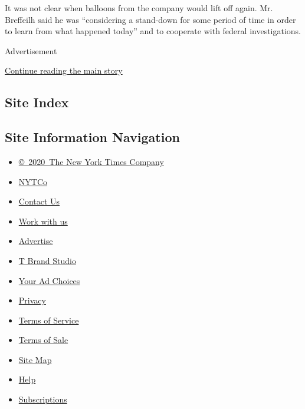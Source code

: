 It was not clear when balloons from the company would lift off again.
Mr. Breffeilh said he was ``considering a stand-down for some period of
time in order to learn from what happened today'' and to cooperate with
federal investigations.

Advertisement

\protect\hyperlink{after-bottom}{Continue reading the main story}

\hypertarget{site-index}{%
\subsection{Site Index}\label{site-index}}

\hypertarget{site-information-navigation}{%
\subsection{Site Information
Navigation}\label{site-information-navigation}}

\begin{itemize}
\tightlist
\item
  \href{https://help.nytimes3xbfgragh.onion/hc/en-us/articles/115014792127-Copyright-notice}{©~2020~The
  New York Times Company}
\end{itemize}

\begin{itemize}
\tightlist
\item
  \href{https://www.nytco.com/}{NYTCo}
\item
  \href{https://help.nytimes3xbfgragh.onion/hc/en-us/articles/115015385887-Contact-Us}{Contact
  Us}
\item
  \href{https://www.nytco.com/careers/}{Work with us}
\item
  \href{https://nytmediakit.com/}{Advertise}
\item
  \href{http://www.tbrandstudio.com/}{T Brand Studio}
\item
  \href{https://www.nytimes3xbfgragh.onion/privacy/cookie-policy\#how-do-i-manage-trackers}{Your
  Ad Choices}
\item
  \href{https://www.nytimes3xbfgragh.onion/privacy}{Privacy}
\item
  \href{https://help.nytimes3xbfgragh.onion/hc/en-us/articles/115014893428-Terms-of-service}{Terms
  of Service}
\item
  \href{https://help.nytimes3xbfgragh.onion/hc/en-us/articles/115014893968-Terms-of-sale}{Terms
  of Sale}
\item
  \href{https://spiderbites.nytimes3xbfgragh.onion}{Site Map}
\item
  \href{https://help.nytimes3xbfgragh.onion/hc/en-us}{Help}
\item
  \href{https://www.nytimes3xbfgragh.onion/subscription?campaignId=37WXW}{Subscriptions}
\end{itemize}
